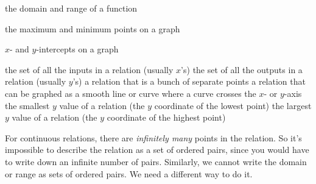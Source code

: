 \documentclass[fleqn,letterpaper,12pt,printwatermark=false]{memoir}
\begin{document}
\newcommand{\myClassName}{Pre-AP Algebra 2}
\newcommand{\myUnitNumber}{1}
\newcommand{\myUnitTitle}{Introduction to Functions}
\newcommand{\myLessonNumber}{2}
\newcommand{\myLessonTitle}{Attributes of Relations and Functions}



\pagestyle{myPagestyle}

\checkandfixthelayout
{}

\begin{myNotesHeader}
    \item {} the domain and range of a function
    \item {} the maximum and minimum points on a graph
    \item {} $x$- and $y$-intercepts on a graph
\end{myNotesHeader}

\begin{myVocabulary}
        {
            the set of all the inputs in a relation 
            (usually $x$'s)
        }
        {
            the set of all the outputs in a relation 
            (usually $y$'s)
        }
        {
            a relation that is a bunch of separate points
        }
        {
            a relation that can be graphed as a smooth line or curve
        }
        {
            where a curve crosses the $x$- or $y$-axis
        }
        {
            the smallest $y$ value of a relation (the $y$ coordinate of the lowest point)
        }
        {
            the largest $y$ value of a relation (the $y$ coordinate of the highest point)
        }
\end{myVocabulary}

\begin{myLesson}[][]
    For continuous relations, there are \emph{infinitely many} points in the relation.
    So it's impossible to describe the relation as a set of ordered pairs, since you would have 
    to write down an infinite number of pairs.
    Similarly, we cannot write the domain or range as sets of ordered pairs.
    We need a different way to do it.
\end{myLesson}
\end{document}
